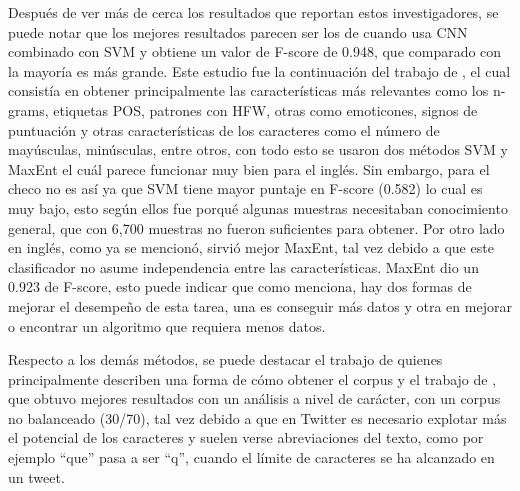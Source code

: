 \par Después de ver más de cerca los resultados que reportan estos investigadores, se puede notar que los mejores resultados parecen ser los de \textcite{poria2016deeper} cuando usa CNN combinado con SVM y obtiene un valor de  \gls{F-score} de 0.948, que comparado con la mayoría es más grande. Este estudio fue la continuación del trabajo de \textcite{ptavcek2014sarcasm}, el cual consistía en obtener principalmente las características más relevantes como los \gls{n-grams}, etiquetas \gls{POS}, patrones con \gls{HFW}, otras como emoticones, signos de puntuación y otras características de los caracteres como el número de mayúsculas, minúsculas, entre otros, con todo esto se usaron dos métodos \gls{SVM} y \gls{MaxEnt} el cuál parece funcionar muy bien para el inglés. Sin embargo, para el checo no es así ya que SVM tiene mayor puntaje en F-score (0.582) lo cual es muy bajo, esto según ellos fue porqué algunas muestras necesitaban conocimiento general, que con 6,700 muestras no fueron suficientes para obtener. Por otro lado en inglés, como ya se mencionó, sirvió mejor \gls{MaxEnt}, tal vez debido a que este clasificador no asume independencia entre las características. \gls{MaxEnt} dio un 0.923 de F-score, esto puede indicar que como \textcite{domingos2012few} menciona, hay dos formas de mejorar el desempeño de esta tarea, una es conseguir más datos y otra en mejorar o encontrar un algoritmo que requiera menos datos.

\par Respecto a los demás métodos, se puede destacar el trabajo de \textcite{reyes2012making} quienes principalmente describen una forma de cómo obtener el corpus y el trabajo de  \textcite{lopez2016character}, que obtuvo mejores resultados con un análisis a nivel de carácter, con un corpus no balanceado (30/70), tal vez debido a que en Twitter es necesario explotar más el potencial de los caracteres y suelen verse abreviaciones del texto, como por ejemplo  ``que'' pasa a ser ``q'', cuando el límite de caracteres se ha alcanzado en un tweet.